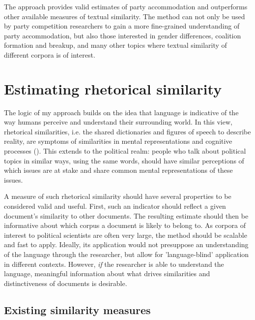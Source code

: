 \documentclass{article}
\begin{document}
The approach provides valid estimates of party accommodation and outperforms other available measures of textual similarity. The method can not only be used by party competition researchers to gain a more fine-grained understanding of party accommodation, but also those interested in gender differences, coalition formation and breakup, and many other topics where textual similarity of different corpora is of interest. \par


\section{Estimating rhetorical similarity}

The logic of my approach builds on the idea that language is indicative of the way humans perceive and understand their surrounding world. In this view, rhetorical similarities, i.e. the shared dictionaries and figures of speech to describe reality, are symptoms of similarities in mental representations and cognitive processes (\cite{Lakoff1980Metaphors, Pennebaker2003}). This extends to the political realm: people who talk about political topics in similar ways, using the same words, should have similar perceptions of which issues are at stake and share common mental representations of these issues.\par

A measure of such rhetorical similarity should have several properties to be considered valid and useful. First, such an indicator should reflect a given document's similarity to other documents. The resulting estimate should then be informative about which corpus a document is likely to belong to. As corpora of interest to political scientists are often very large, the method should be scalable and fast to apply. Ideally, its application would not presuppose an understanding of the language through the researcher, but allow for 'language-blind' application in different contexts. However, \textit{if} the researcher is able to understand the language, meaningful information about what drives similarities and distinctiveness of documents is desirable. \par


\subsection{Existing similarity measures}
\end{document}
